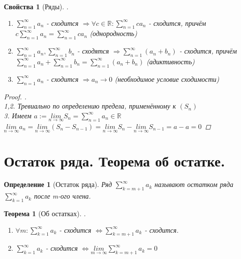\documentclass[12pt, a4]{article}
\newtheorem*{theorem}{Теорема}
\newtheorem*{definition}{Определение}
\newtheorem*{properties}{Свойства}
\renewcommand{\lim}[2]{\underset{#1 \rightarrow #2}{lim}}
\newcommand{\limn}{\lim{n}{\infty}}
\renewcommand{\implies}{\Rightarrow}
\renewcommand{\iff}{\Leftrightarrow}
\newcommand{\R}{\mathbb{R}}
\begin{document}
\begin{properties}[Ряды].\\
\begin{enumerate}
    \item $\sum_{n=1}^\infty a_n$ - сходится $\implies \forall c \in \R: \sum_{n=1}^\infty c a_n$ - сходится, причём $c\sum_{n=1}^\infty a_n = \sum_{n=1}^\infty c a_n$ (однородность)
    \item $\sum_{n=1}^\infty a_n, \sum_{n=1}^\infty b_n$ - сходятся $\implies \sum_{n=1}^\infty(a_n + b_n)$ - сходится, причём $\sum_{n=1}^\infty a_n + \sum_{n=1}^\infty b_n = \sum_{n=1}^\infty (a_n+b_n)$ (адиктивность)
    \item $\sum_{n=1}^\infty a_n$ - сходится $\implies a_n \to 0$ (необходимое условие сходимости)
\end{enumerate}

\begin{proof}.\\
1,2. Тревиально по определению предела, применённому к $(S_n)$\\
3. Имеем $a := \limn S_n = \sum_{n=1}^\infty a_n \in \R$\\
$\limn a_n = \limn (S_n - S_{n-1}) = \limn S_n - \limn S_{n-1} = a - a = 0$
\end{proof}
\end{properties}

\section{ Остаток ряда. Теорема об остатке.}

\begin{definition}[Остаток ряда]
Ряд $\sum_{k=m+1}^\infty a_k$ называют остатком ряда $\sum_{k=1}^\infty a_k$ после m-ого члена.
\end{definition}

\begin{theorem}[Об остатках].\\
\begin{enumerate}
    \item $\forall m: \sum_{k=1}^\infty a_k$ - сходится $\iff \sum_{k=m+1}^\infty a_k$ - сходится.
    \item $\sum_{k=1}^\infty a_k$ - сходится $\iff \lim{m}{\infty}\sum_{k=m+1}^\infty a_k = 0$
\end{enumerate}
\end{theorem}
\end{document}
